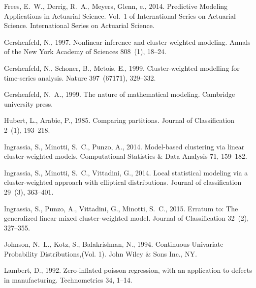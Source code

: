 \documentclass[12pt,letterpaper]{article}
\numberwithin{equation}{section}
\numberwithin{equation}{section}
\numberwithin{equation}{section}
\begin{document}
\begin{thebibliography}{36}
Frees, E.~W., Derrig, R.~A., Meyers, Glenn, e., 2014. Predictive Modeling
  Applications in Actuarial Science. Vol.~1 of International Series on
  Actuarial Science. International Series on Actuarial Science.

Gershenfeld, N., 1997. Nonlinear inference and cluster-weighted modeling.
  Annals of the New York Academy of Sciences 808~(1), 18--24.

Gershenfeld, N., Schoner, B., Metois, E., 1999. Cluster-weighted modelling for
  time-series analysis. Nature 397~(67171), 329--332.

Gershenfeld, N.~A., 1999. The nature of mathematical modeling. Cambridge
  university press.

Hubert, L., Arabie, P., 1985. Comparing partitions. Journal of Classification
  2~(1), 193--218.

Ingrassia, S., Minotti, S.~C., Punzo, A., 2014{}. Model-based
  clustering via linear cluster-weighted models. Computational Statistics \&
  Data Analysis 71, 159--182.

Ingrassia, S., Minotti, S.~C., Vittadini, G., 2014{}. Local
  statistical modeling via a cluster-weighted approach with elliptical
  distributions. Journal of classification 29~(3), 363--401.

Ingrassia, S., Punzo, A., Vittadini, G., Minotti, S.~C., 2015. Erratum to: The
  generalized linear mixed cluster-weighted model. Journal of Classification
  32~(2), 327--355.

Johnson, N.~L., Kotz, S., Balakrishnan, N., 1994. Continuous Univariate
  Probability Distributions,(Vol. 1). John Wiley \& Sons Inc., NY.

Lambert, D., 1992. Zero-inflated poisson regression, with an application to
  defects in manufacturing. Technometrics 34, 1--14.


\end{thebibliography}
\end{document}

